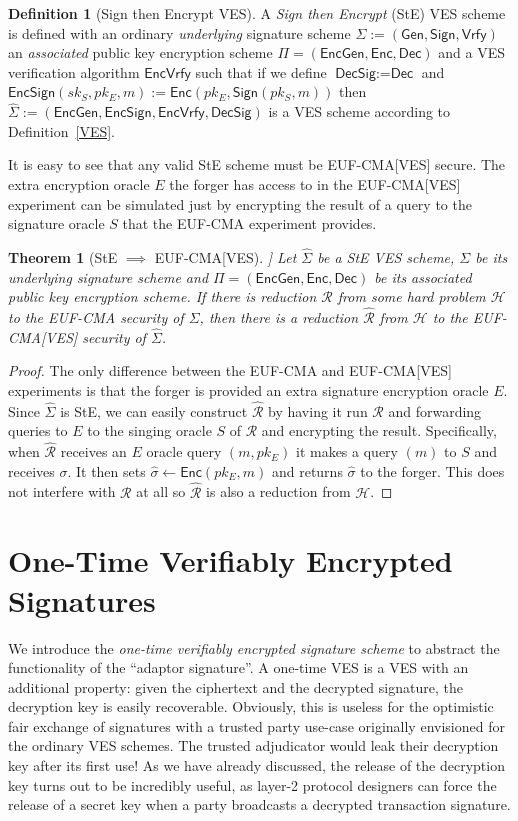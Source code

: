 \documentclass[fullpage]{article}
\newtheorem{theorem}{Theorem}[section]
\theoremstyle{definition}
\newtheorem{definition}{Definition}[section]
\newcommand{\EUFCMA}{\textsf{EUF-CMA}\xspace}
\newcommand{\EUFCMAVES}{\textsf{EUF-CMA}[\textsf{VES}]\xspace}
\newcommand{\Dec}{\textsf{Dec}}
\newcommand{\Enc}{\textsf{Enc}}
\newcommand{\EncGen}{\textsf{EncGen}}
\newcommand{\EncSign}{\textsf{EncSign}}
\newcommand{\EncVer}{\textsf{EncVrfy}}
\newcommand{\DecSig}{\textsf{DecSig}}
\newcommand{\KeyGen}{\textsf{Gen}}
\newcommand{\Sign}{\textsf{Sign}}
\newcommand{\Verify}{\textsf{Vrfy}}
\newcommand{\SIGNALG}{\KeyGen, \Sign, \Verify}
\newcommand{\ENCALG}{\EncGen, \Enc, \Dec}
\newcommand{\skSign}{sk_S}
\newcommand{\pkSign}{pk_S}
\newcommand{\pkEnc}{pk_E}
\newcommand{\hatsigma}{\hat{\sigma}}
\newcommand{\hatSigma}{\hat{\Sigma}}
\newcommand{\R}{\mathcal{R}}
\newcommand{\hatR}{\hat{\mathcal{R}}}
\newcommand{\hardproblem}{\mathcal{H}}
\begin{document}
\begin{definition}[Sign then Encrypt VES]
A \emph{Sign then Encrypt} (StE) VES scheme is defined with an ordinary \emph{underlying} signature scheme $\Sigma := (\SIGNALG)$ an \emph{associated} public key encryption scheme $\Pi = (\ENCALG)$ and a VES verification algorithm $\EncVer$ such that if we define $\DecSig := \Dec$ and $\EncSign(\skSign, \pkEnc, m) := \Enc(\pkEnc, \Sign(\pkSign, m))$ then $\hatSigma := (\EncGen, \EncSign, \EncVer, \DecSig)$ is a VES scheme according to Definition~\ref{VES}.
\end{definition}

It is easy to see that any valid StE scheme must be \EUFCMAVES secure. The extra encryption oracle $E$ the forger has access to in the \EUFCMAVES experiment can be simulated just by encrypting the result of a query to the signature oracle $S$ that the \EUFCMA experiment provides.

\begin{theorem}[StE $\implies$ \EUFCMAVES]
Let $\hatSigma$ be a StE VES scheme,  $\Sigma$ be its underlying signature scheme and $\Pi = (\ENCALG)$ be its associated public key encryption scheme.
If there is reduction $\R$ from some hard problem $\hardproblem$ to the \EUFCMA security of $\Sigma$, then there is a reduction $\hatR$ from $\hardproblem$ to the \EUFCMAVES security of $\hatSigma$.
\end{theorem}

\begin{proof}
The only difference between the \EUFCMA and \EUFCMAVES experiments is that the forger is provided an extra signature encryption oracle $E$. Since $\hatSigma$ is StE, we can easily construct $\hatR$ by having it run $\R$ and forwarding queries to $E$ to the singing oracle $S$ of $\R$ and encrypting the result. Specifically, when $\hatR$ receives an $E$ oracle query $(m, \pkEnc)$ it makes a query $(m)$ to $S$ and receives $\sigma$. It then sets $\hatsigma \gets \Enc(\pkEnc, m)$ and returns $\hatsigma$ to the forger. This does not interfere with $\R$ at all so $\hatR$ is also a reduction from $\hardproblem$.
\end{proof}

\section{One-Time Verifiably Encrypted Signatures}
\label{otVES}
We introduce the \emph{one-time verifiably encrypted signature scheme} to abstract the functionality of the ``adaptor signature''\cite{poelstra-adaptor}. A one-time VES is a VES with an additional property: given the ciphertext and the decrypted signature, the decryption key is easily recoverable. Obviously, this is useless for the optimistic fair exchange of signatures with a trusted party use-case originally envisioned for the ordinary VES schemes. The trusted adjudicator would leak their decryption key after its first use! As we have already discussed, the release of the decryption key turns out to be incredibly useful, as layer-2 protocol designers can force the release of a secret key when a party broadcasts a decrypted transaction signature.
\end{document}
